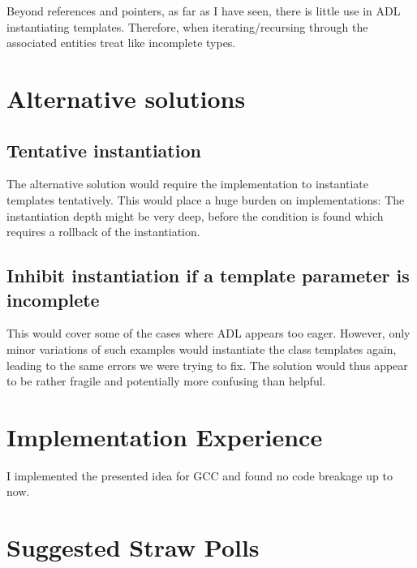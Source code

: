 Beyond references and pointers, as far as I have seen, there is little use in ADL 
instantiating templates. Therefore, when iterating/recursing through the associated entities treat 
\notyetinstantiated like incomplete types.

\section{Alternative solutions}

\subsection{Tentative instantiation}
The alternative solution would require the implementation to instantiate templates 
tentatively. This would place a huge burden on implementations: The instantiation depth 
might be very deep, before the condition is found which requires a rollback of the 
instantiation.

\subsection{Inhibit instantiation if a template parameter is incomplete}

This would cover some of the cases where ADL appears too eager. However, only minor 
variations of such examples would instantiate the class templates again, leading to the 
same errors we were trying to fix. The solution would thus appear to be rather fragile and 
potentially more confusing than helpful.

\section{Implementation Experience}
I implemented the presented idea for GCC and found no code breakage up to now.

\section{Suggested Straw Polls}


